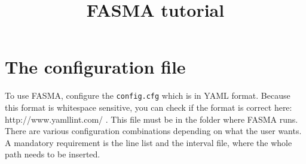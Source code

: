 \documentclass[a4paper,12pt]{article}
\title{FASMA tutorial}
\author{}
\begin{document}
\maketitle


\section{The configuration file}

To use FASMA, configure the \texttt{config.cfg} which is in YAML format. Because this format is whitespace sensitive, you can check if the format is correct here: http://www.yamllint.com/ .
This file must be in the folder where FASMA runs. There are various configuration combinations depending on what the user wants. A mandatory requirement is the line list and the interval 
file, where the whole path needs to be inserted. 
\end{document}
